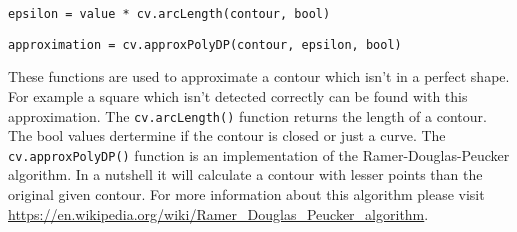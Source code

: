 \texttt{epsilon = value * cv.arcLength(contour, bool)}

\texttt{approximation = cv.approxPolyDP(contour, epsilon, bool)}

These functions are used to approximate a contour which isn't in a perfect shape.
For example a square which isn't detected correctly can be found with this approximation.
The \texttt{cv.arcLength()} function returns the length of a contour.
The bool values dertermine if the contour is closed or just a curve.
The \texttt{cv.approxPolyDP()} function is an implementation of the Ramer-Douglas-Peucker algorithm.
In a nutshell it will calculate a contour with lesser points than the original given contour.
For more information about this algorithm please visit \url{https://en.wikipedia.org/wiki/Ramer\_Douglas\_Peucker\_algorithm}.


